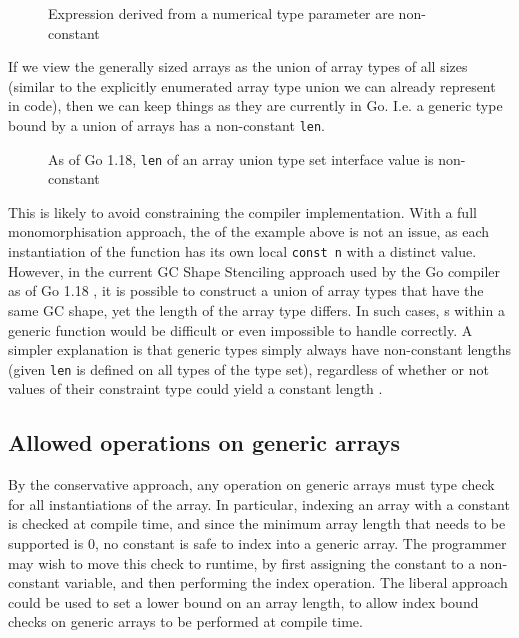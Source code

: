 \begin{figure}
    \caption{Expression derived from a numerical type parameter are non-constant}
\end{figure}

If we view the generally sized arrays as the union of array types of all sizes
(similar to the explicitly enumerated array type union we can already represent
in code), then we can keep things as they are currently in Go. I.e. a generic
type bound by a union of arrays has a non-constant \texttt{len}.

\begin{figure}
    \caption{As of Go 1.18, \texttt{len} of an array union type set interface
        value is non-constant}
\end{figure}

This is likely to avoid constraining the compiler implementation. With a full
monomorphisation approach, the  of the example above is not an issue,
as each instantiation of the function has its own local \texttt{const n} with a
distinct value. However, in the current GC Shape Stenciling approach used by the
Go compiler as of Go 1.18 \autocite{generics1.18}, it is possible to construct a
union of array types that have the same GC shape, yet the length of the array
type differs. In such cases, s within a generic function would be
difficult or even impossible to handle correctly. A simpler explanation is that
generic types simply always have non-constant lengths (given \texttt{len} is
defined on all types of the type set), regardless of whether or not values of
their constraint type could yield a constant length \autocite{spec}.

\subsection{Allowed operations on generic arrays}

By the conservative approach, any operation on generic arrays must type check
for all instantiations of the array. In particular, indexing an array with a
constant is checked at compile time, and since the minimum array length that
needs to be supported is 0, no constant is safe to index into a generic array.
The programmer may wish to move this check to runtime, by first assigning the
constant to a non-constant  variable, and then performing the index
operation. The liberal approach could be used to set a lower bound on an array
length, to allow index bound checks on generic arrays to be performed at
compile time.

